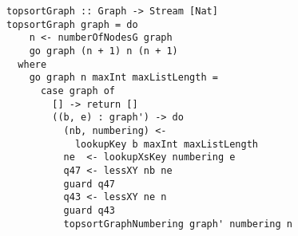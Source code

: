 \begin{figure}[!t]
  \centering
  \begin{minipage}{0.49\textwidth}
    \begin{lstlisting}[label={topsort_graph}, caption={Functional implementation for a \lstinline{topsortoTrue in out} direction}, captionpos=b, frame=tb]
topsortGraph :: Graph -> Stream [Nat]
topsortGraph graph = do
    n <- numberOfNodesG graph
    go graph (n + 1) n (n + 1)
  where
    go graph n maxInt maxListLength =
      case graph of
        [] -> return []
        ((b, e) : graph') -> do
          (nb, numbering) <-
            lookupKey b maxInt maxListLength
          ne  <- lookupXsKey numbering e
          q47 <- lessXY nb ne
          guard q47
          q43 <- lessXY ne n
          guard q43
          topsortGraphNumbering graph' numbering n
    \end{lstlisting}
  \end{minipage}
\end{figure}
